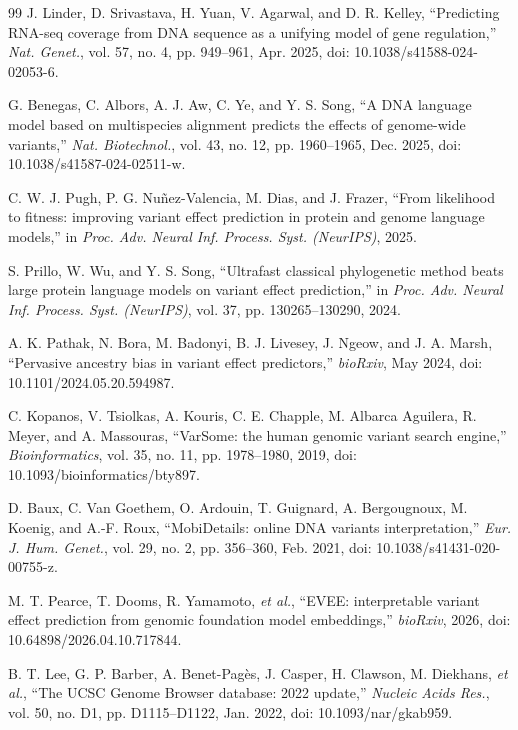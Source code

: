 \documentclass[10pt,journal,a4paper]{IEEEtran}
\begin{document}
\begin{thebibliography}{99}
 J. Linder, D. Srivastava, H. Yuan, V. Agarwal, and D. R. Kelley, ``Predicting RNA-seq coverage from DNA sequence as a unifying model of gene regulation,'' \textit{Nat. Genet.}, vol. 57, no. 4, pp. 949--961, Apr. 2025, doi: 10.1038/s41588-024-02053-6.

 G. Benegas, C. Albors, A. J. Aw, C. Ye, and Y. S. Song, ``A DNA language model based on multispecies alignment predicts the effects of genome-wide variants,'' \textit{Nat. Biotechnol.}, vol. 43, no. 12, pp. 1960--1965, Dec. 2025, doi: 10.1038/s41587-024-02511-w.

 C. W. J. Pugh, P. G. Nu\~nez-Valencia, M. Dias, and J. Frazer, ``From likelihood to fitness: improving variant effect prediction in protein and genome language models,'' in \textit{Proc. Adv. Neural Inf. Process. Syst. (NeurIPS)}, 2025.

 S. Prillo, W. Wu, and Y. S. Song, ``Ultrafast classical phylogenetic method beats large protein language models on variant effect prediction,'' in \textit{Proc. Adv. Neural Inf. Process. Syst. (NeurIPS)}, vol. 37, pp. 130265--130290, 2024.

 A. K. Pathak, N. Bora, M. Badonyi, B. J. Livesey, J. Ngeow, and J. A. Marsh, ``Pervasive ancestry bias in variant effect predictors,'' \textit{bioRxiv}, May 2024, doi: 10.1101/2024.05.20.594987.

 C. Kopanos, V. Tsiolkas, A. Kouris, C. E. Chapple, M. Albarca Aguilera, R. Meyer, and A. Massouras, ``VarSome: the human genomic variant search engine,'' \textit{Bioinformatics}, vol. 35, no. 11, pp. 1978--1980, 2019, doi: 10.1093/bioinformatics/bty897.

 D. Baux, C. Van Goethem, O. Ardouin, T. Guignard, A. Bergougnoux, M. Koenig, and A.-F. Roux, ``MobiDetails: online DNA variants interpretation,'' \textit{Eur. J. Hum. Genet.}, vol. 29, no. 2, pp. 356--360, Feb. 2021, doi: 10.1038/s41431-020-00755-z.

 M. T. Pearce, T. Dooms, R. Yamamoto, \emph{et al.}, ``EVEE: interpretable variant effect prediction from genomic foundation model embeddings,'' \textit{bioRxiv}, 2026, doi: 10.64898/2026.04.10.717844.

 B. T. Lee, G. P. Barber, A. Benet-Pag\`es, J. Casper, H. Clawson, M. Diekhans, \emph{et al.}, ``The UCSC Genome Browser database: 2022 update,'' \textit{Nucleic Acids Res.}, vol. 50, no. D1, pp. D1115--D1122, Jan. 2022, doi: 10.1093/nar/gkab959.


\end{thebibliography}
\end{document}
